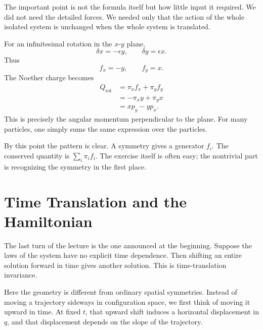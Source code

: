The important point is not the formula itself but how little input it required. We did not need the detailed forces. We needed only that the action of the whole isolated system is unchanged when the whole system is translated.

For an infinitesimal rotation in the \(x\)-\(y\) plane,
\begin{equation}
\delta x=-\epsilon y,
\qquad
\delta y=\epsilon x.
\end{equation}
Thus
\begin{equation}
f_x=-y,
\qquad
f_y=x.
\end{equation}
The Noether charge becomes
\begin{align}
Q_{\mathrm{rot}}
&=\pi_x f_x+\pi_y f_y \\
&=-\pi_x y+\pi_y x \\
&=xp_y-yp_x.
\end{align}
This is precisely the angular momentum perpendicular to the plane. For many particles, one simply sums the same expression over the particles.

By this point the pattern is clear. A symmetry gives a generator \(f_i\). The conserved quantity is \(\sum_i \pi_i f_i\). The exercise itself is often easy; the nontrivial part is recognizing the symmetry in the first place.

\section{Time Translation and the Hamiltonian}

The last turn of the lecture is the one announced at the beginning. Suppose the laws of the system have no explicit time dependence. Then shifting an entire solution forward in time gives another solution. This is time-translation invariance.

Here the geometry is different from ordinary spatial symmetries. Instead of moving a trajectory sideways in configuration space, we first think of moving it upward in time. At fixed \(t\), that upward shift induces a horizontal displacement in \(q\), and that displacement depends on the slope of the trajectory.

\begin{figure}[h]
\centering
{}
\end{figure}

